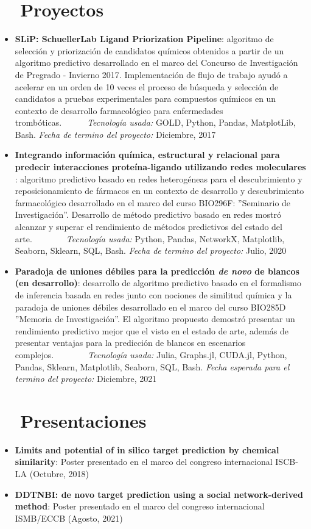 \documentclass[letter,20pt]{article}
\newcommand{\resumeItem}[2]{
  \item\small{
    \textbf{#1}{: #2 \vspace{-2pt}}
  }
}
\newcommand{\resumeSubItem}[2]{\resumeItem{#1}{#2}\vspace{-3pt}}
\newcommand{\resumeSubHeadingListStart}{\begin{itemize}[leftmargin=*]}
\newcommand{\resumeSubHeadingListEnd}{\end{itemize}}
\begin{document}
\section{~~Proyectos}
\resumeSubHeadingListStart
\resumeSubItem{SLiP: SchuellerLab Ligand Priorization Pipeline}{algoritmo de selección y priorización de candidatos químicos obtenidos a partir de un algoritmo predictivo desarrollado en el marco del Concurso de Investigación de Pregrado - Invierno 2017. Implementación de flujo de trabajo ayudó a acelerar en un orden de 10 veces el proceso de búsqueda y selección de candidatos a pruebas experimentales para compuestos químicos en un contexto de desarrollo farmacológico para enfermedades trombóticas.~~~~~~\textit{Tecnología usada:} GOLD, Python, Pandas, MatplotLib, Bash. \textit{Fecha de termino del proyecto:} Diciembre, 2017}
\vspace{-2pt}
\resumeSubItem{Integrando información química, estructural y relacional para predecir interacciones proteína-ligando utilizando redes moleculares }{algoritmo predictivo basado en redes heterogéneas para el descubrimiento y reposicionamiento de fármacos en un contexto de desarrollo y descubrimiento farmacológico desarrollado en el marco del curso BIO296F: ''Seminario de Investigación''. Desarrollo de método predictivo basado en redes mostró alcanzar y superar el rendimiento de métodos predictivos del estado del arte.~~~~~~~~\textit{Tecnología usada:} Python, Pandas, NetworkX, Matplotlib, Seaborn, Sklearn, SQL, Bash. \textit{Fecha de termino del proyecto:} Julio, 2020}
\vspace{-2pt}
\resumeSubItem{Paradoja de uniones débiles para la predicción \textit{de novo} de blancos (en desarrollo)}{desarrollo de algoritmo predictivo basado en el formalismo de inferencia basada en redes junto con nociones de similitud química y la paradoja de uniones débiles desarrollado en el marco del curso BIO285D ''Memoria de Investigación''. El algoritmo propuesto demostró presentar un rendimiento predictivo mejor que el visto en el estado de arte, además de presentar ventajas para la predicción de blancos en escenarios complejos.~~~~~~~~\textit{Tecnología usada:} Julia, Graphs.jl, CUDA.jl, Python, Pandas, Sklearn, Matplotlib, Seaborn, SQL, Bash. \textit{Fecha esperada para el termino del proyecto:} Diciembre, 2021}
\resumeSubHeadingListEnd
\vspace{-5pt}
\section{~~Presentaciones}
\resumeSubHeadingListStart
\resumeSubItem{Limits and potential of in silico target prediction by chemical similarity}{Poster presentado en el marco del congreso internacional ISCB-LA (Octubre, 2018)}
\vspace{2pt}
\resumeSubItem{DDTNBI: de novo target prediction using a social network-derived method}{Poster presentado en el marco del congreso internacional ISMB/ECCB (Agosto, 2021)}
\resumeSubHeadingListEnd
\vspace{-5pt}
\end{document}
